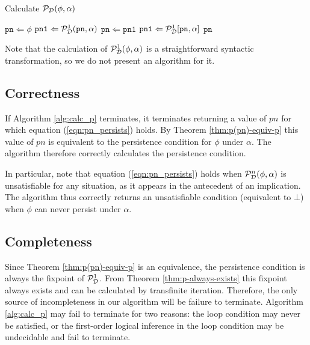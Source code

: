 %
\begin{algorithm}
\caption{Calculate $\mathcal{P}_{\mathcal{D}}(\phi,\alpha)$}


\label{alg:calc_p} \begin{algorithmic} \STATE $\mathtt{pn}\Leftarrow\phi$
\STATE $\mathtt{pn1}\Leftarrow\mathcal{P}_{\mathcal{D}}^{1}(\mathtt{pn},\alpha)$
\STATE $\mathtt{pn}\Leftarrow\mathtt{pn1}$ \STATE $\mathtt{pn1}\Leftarrow\mathcal{P}_{\mathcal{D}}^{1}[\mathtt{pn},\alpha]$
\ENDWHILE \RETURN $\mathtt{pn}$ \end{algorithmic} 
\end{algorithm}


Note that the calculation of $\mathcal{P}_{\mathcal{D}}^{1}(\phi,\alpha)$ is a straightforward
syntactic transformation, so we do not present an algorithm for it.


\subsection{Correctness}

If Algorithm \ref{alg:calc_p} terminates, it terminates returning
a value of $pn$ for which equation (\ref{eqn:pn_persists}) holds.
By Theorem \ref{thm:p(pn)-equiv-p} this value of $pn$ is equivalent
to the persistence condition for $\phi$ under $\alpha$. The algorithm
therefore correctly calculates the persistence condition.

In particular, note that equation (\ref{eqn:pn_persists}) holds when
$\mathcal{P}_{\mathcal{D}}^{n}(\phi,\alpha)$ is unsatisfiable for any situation,
as it appears in the antecedent of an implication. The algorithm thus
correctly returns an unsatisfiable condition (equivalent to $\bot$)
when $\phi$ can never persist under $\alpha$.


\subsection{Completeness}

Since Theorem \ref{thm:p(pn)-equiv-p} is an equivalence, the persistence
condition is always the fixpoint of $\mathcal{P}^{1}_{\mathcal{D}}$. From Theorem \ref{thm:p-always-exists}
this fixpoint always exists and can be calculated by transfinite iteration.
Therefore, the only source of incompleteness in our algorithm will
be failure to terminate. Algorithm \ref{alg:calc_p} may fail to terminate
for two reasons: the loop condition may never be satisfied, or the
first-order logical inference in the loop condition may be undecidable
and fail to terminate.

